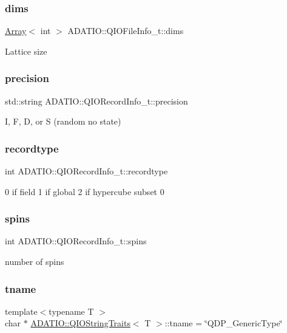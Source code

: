 \subsubsection{\texorpdfstring{dims}{dims}}
{\footnotesize\ttfamily \mbox{\hyperlink{classXMLArray_1_1Array}{Array}}$<$ int $>$ A\+D\+A\+T\+I\+O\+::\+Q\+I\+O\+File\+Info\+\_\+t\+::dims}

Lattice size \mbox{\label{group__qio_gaba8466af5dd242de9e6d63fc5112e6df}} 
\subsubsection{\texorpdfstring{precision}{precision}}
{\footnotesize\ttfamily std\+::string A\+D\+A\+T\+I\+O\+::\+Q\+I\+O\+Record\+Info\+\_\+t\+::precision}

I, F, D, or S (random no state) \mbox{\label{group__qio_ga88cd070912edbe6d09a2437d3d9c6d08}} 
\subsubsection{\texorpdfstring{recordtype}{recordtype}}
{\footnotesize\ttfamily int A\+D\+A\+T\+I\+O\+::\+Q\+I\+O\+Record\+Info\+\_\+t\+::recordtype}

0 if field 1 if global 2 if hypercube subset 0 \mbox{\label{group__qio_ga1a819261ad8c96e3e9378fc74742b1f4}} 
\subsubsection{\texorpdfstring{spins}{spins}}
{\footnotesize\ttfamily int A\+D\+A\+T\+I\+O\+::\+Q\+I\+O\+Record\+Info\+\_\+t\+::spins}

number of spins \mbox{\label{group__qio_ga14189398447447c3ff6d039d05033619}} 
\subsubsection{\texorpdfstring{tname}{tname}\hspace{0.1cm}{\footnotesize\ttfamily [1/3]}}
{\footnotesize\ttfamily template$<$typename T $>$ \\
char $\ast$ \mbox{\hyperlink{structADATIO_1_1QIOStringTraits}{A\+D\+A\+T\+I\+O\+::\+Q\+I\+O\+String\+Traits}}$<$ T $>$\+::tname = \char`\"{}Q\+D\+P\+\_\+\+Generic\+Type\char`\"{}\hspace{0.3cm}{\ttfamily [static]}}



